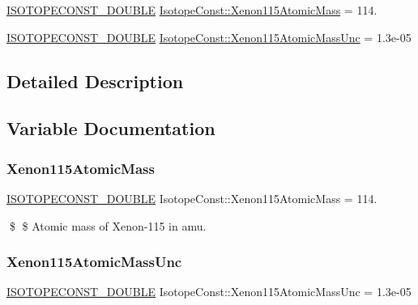 \begin{DoxyCompactItemize}
\item 
\mbox{\hyperlink{group___isotope_const-_macros_ga8f45a7272ce02c0b4c65c44636ed719a}{I\+S\+O\+T\+O\+P\+E\+C\+O\+N\+S\+T\+\_\+\+D\+O\+U\+B\+LE}} \mbox{\hyperlink{group___isotope_const-_xenon-_xe115_ga7f0c9028e214065d36ebec84df623468}{Isotope\+Const\+::\+Xenon115\+Atomic\+Mass}} = 114.
\item 
\mbox{\hyperlink{group___isotope_const-_macros_ga8f45a7272ce02c0b4c65c44636ed719a}{I\+S\+O\+T\+O\+P\+E\+C\+O\+N\+S\+T\+\_\+\+D\+O\+U\+B\+LE}} \mbox{\hyperlink{group___isotope_const-_xenon-_xe115_ga5ec6fe796c2b2fabbba5f8ab67fa3b83}{Isotope\+Const\+::\+Xenon115\+Atomic\+Mass\+Unc}} = 1.\+3e-\/05
\end{DoxyCompactItemize}


\subsection{Detailed Description}


\subsection{Variable Documentation}
\mbox{\label{group___isotope_const-_xenon-_xe115_ga7f0c9028e214065d36ebec84df623468}} 
\subsubsection{\texorpdfstring{Xenon115\+Atomic\+Mass}{Xenon115AtomicMass}}
{\footnotesize\ttfamily \mbox{\hyperlink{group___isotope_const-_macros_ga8f45a7272ce02c0b4c65c44636ed719a}{I\+S\+O\+T\+O\+P\+E\+C\+O\+N\+S\+T\+\_\+\+D\+O\+U\+B\+LE}} Isotope\+Const\+::\+Xenon115\+Atomic\+Mass = 114.}

\$ \$ Atomic mass of Xenon-\/115 in amu. \mbox{\label{group___isotope_const-_xenon-_xe115_ga5ec6fe796c2b2fabbba5f8ab67fa3b83}} 
\subsubsection{\texorpdfstring{Xenon115\+Atomic\+Mass\+Unc}{Xenon115AtomicMassUnc}}
{\footnotesize\ttfamily \mbox{\hyperlink{group___isotope_const-_macros_ga8f45a7272ce02c0b4c65c44636ed719a}{I\+S\+O\+T\+O\+P\+E\+C\+O\+N\+S\+T\+\_\+\+D\+O\+U\+B\+LE}} Isotope\+Const\+::\+Xenon115\+Atomic\+Mass\+Unc = 1.\+3e-\/05}

